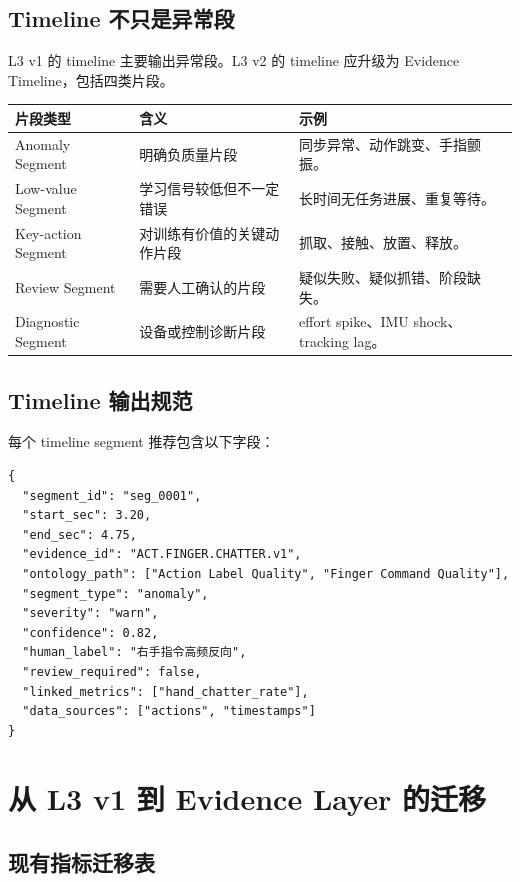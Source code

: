 \documentclass[UTF8,zihao=-4]{ctexart}
\begin{document}
\subsection{Timeline 不只是异常段}

L3 v1 的 timeline 主要输出异常段。L3 v2 的 timeline 应升级为 Evidence Timeline，包括四类片段。

\begin{longtable}{L{3cm} L{4.8cm} L{5.9cm}}
\toprule
片段类型 & 含义 & 示例 \\
\midrule
Anomaly Segment & 明确负质量片段 & 同步异常、动作跳变、手指颤振。 \\
Low-value Segment & 学习信号较低但不一定错误 & 长时间无任务进展、重复等待。 \\
Key-action Segment & 对训练有价值的关键动作片段 & 抓取、接触、放置、释放。 \\
Review Segment & 需要人工确认的片段 & 疑似失败、疑似抓错、阶段缺失。 \\
Diagnostic Segment & 设备或控制诊断片段 & effort spike、IMU shock、tracking lag。 \\
\bottomrule
\end{longtable}

\subsection{Timeline 输出规范}

每个 timeline segment 推荐包含以下字段：

\begin{verbatim}
{
  "segment_id": "seg_0001",
  "start_sec": 3.20,
  "end_sec": 4.75,
  "evidence_id": "ACT.FINGER.CHATTER.v1",
  "ontology_path": ["Action Label Quality", "Finger Command Quality"],
  "segment_type": "anomaly",
  "severity": "warn",
  "confidence": 0.82,
  "human_label": "右手指令高频反向",
  "review_required": false,
  "linked_metrics": ["hand_chatter_rate"],
  "data_sources": ["actions", "timestamps"]
}
\end{verbatim}

\section{从 L3 v1 到 Evidence Layer 的迁移}

\subsection{现有指标迁移表}
\end{document}
